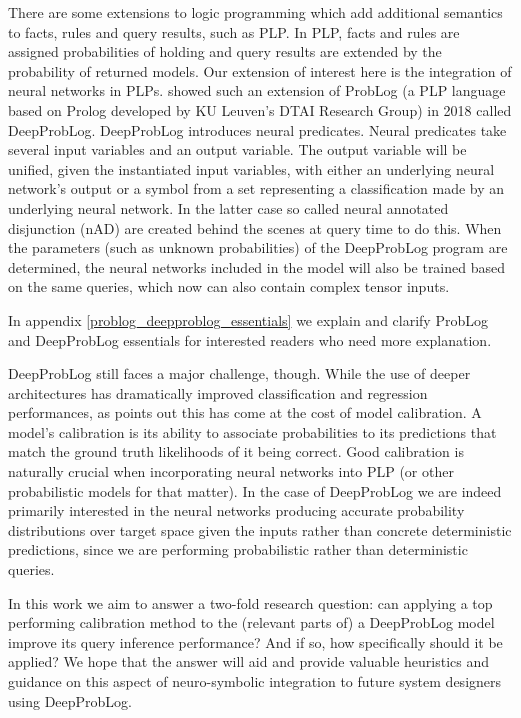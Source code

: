 There are some extensions to logic programming which add additional semantics to facts, rules and query results, such as PLP. In PLP, facts and rules are assigned probabilities of holding and query results are extended by the probability of returned models. Our extension of interest here is the integration of neural networks in PLPs. \cite{manhaeve2018deepproblog} showed such an extension of ProbLog (a PLP language based on Prolog developed by KU Leuven's DTAI Research Group) in 2018 called DeepProbLog. DeepProbLog introduces neural predicates. Neural predicates take several input variables and an output variable. The output variable will be unified, given the instantiated input variables, with either an underlying neural network's output or a symbol from a set representing a classification made by an underlying neural network. In the latter case so called neural annotated disjunction (nAD) are created behind the scenes at query time to do this. When the parameters (such as unknown probabilities) of the DeepProbLog program are determined, the neural networks included in the model will also be trained based on the same queries, which now can also contain complex tensor inputs. \par
In appendix \ref{problog_deepproblog_essentials} we explain and clarify ProbLog and DeepProbLog essentials for interested readers who need more explanation. \par
DeepProbLog still faces a major challenge, though. While the use of deeper architectures has dramatically improved classification and regression performances, as \cite{guo2017calibration} points out this has come at the cost of model calibration. A model's calibration is its ability to associate probabilities to its predictions that match the ground truth likelihoods of it being correct. Good calibration is naturally crucial when incorporating neural networks into PLP (or other probabilistic models for that matter). In the case of DeepProbLog we are indeed primarily interested in the neural networks producing accurate probability distributions over target space given the inputs rather than concrete deterministic predictions, since we are performing probabilistic rather than deterministic queries. \par
In this work we aim to answer a two-fold research question: can applying a top performing calibration method to the (relevant parts of) a DeepProbLog model improve its query inference performance? And if so, how specifically should it be applied? We hope that the answer will aid and provide valuable heuristics and guidance on this aspect of neuro-symbolic integration to future system designers using DeepProbLog.